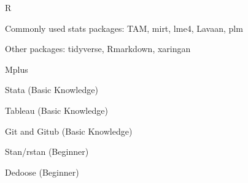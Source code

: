 \documentclass[]{article}
\providecommand{\tightlist}{%
  \setlength{\itemsep}{0pt}\setlength{\parskip}{0pt}}
\renewenvironment{itemize}{
  \begin{list}{}{
    \setlength{\leftmargin}{1.5em}
  }
}{
  \end{list}
}
\begin{document}
\begin{itemize}
\tightlist
\item
  R

  \begin{itemize}
  \tightlist
  \item
    Commonly used stats packages: TAM, mirt, lme4, Lavaan, plm
  \item
    Other packages: tidyverse, Rmarkdown, xaringan
  \end{itemize}
\item
  Mplus
\item
  Stata (Basic Knowledge)\\
\item
  Tableau (Basic Knowledge)\\
\item
  Git and Gitub (Basic Knowledge)\\
\item
  Stan/rstan (Beginner)\\
\item
  Dedoose (Beginner)
\end{itemize}
\end{document}
